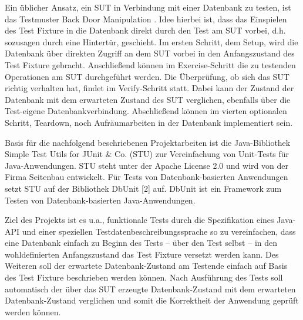 Ein üblicher Ansatz, ein SUT in Verbindung mit einer Datenbank zu testen, ist das Testmuster Back Door Manipulation \cite{XUNIT_TEST_PATTERNS}. Idee hierbei ist, dass das Einspielen des Test Fixture in die Datenbank direkt durch den Test am SUT vorbei, d.h. sozusagen durch eine Hintertür, geschieht. Im ersten Schritt, dem Setup, wird die Datenbank über direkten Zugriff an dem SUT vorbei in den Anfangszustand des Test Fixture gebracht. Anschließend können im Exercise-Schritt die zu testenden Operationen am SUT durchgeführt werden. Die Überprüfung, ob sich das SUT richtig verhalten hat, findet im Verify-Schritt statt. Dabei kann der Zustand der Datenbank mit dem erwarteten Zustand des SUT verglichen, ebenfalls über die Test-eigene Datenbankverbindung. Abschließend können im vierten optionalen Schritt, Teardown, noch Aufräumarbeiten in der Datenbank implementiert sein.

Basis für die nachfolgend beschriebenen Projektarbeiten ist die Java-Bibliothek Simple Test Utils for JUnit \& Co. (STU) zur Vereinfachung von Unit-Tests für Java-Anwendungen. STU steht unter der Apache License 2.0 und wird von der Firma Seitenbau entwickelt. Für Tests von Datenbank-basierten Anwendungen setzt STU auf der Bibliothek DbUnit [2] auf. DbUnit ist ein Framework zum Testen von Datenbank-basierten Java-Anwendungen. 

Ziel des Projekts ist es u.a., funktionale Tests durch die Spezifikation eines Java-API und einer speziellen Testdatenbeschreibungssprache so zu vereinfachen, dass eine Datenbank einfach zu Beginn des Tests – über den Test selbst – in den wohldefinierten Anfangszustand das Test Fixture versetzt werden kann. Des Weiteren soll der erwartete Datenbank-Zustand am Testende einfach auf Basis des Test Fixture beschrieben werden können. Nach Ausführung des Tests soll automatisch der über das SUT erzeugte Datenbank-Zustand mit dem erwarteten Datenbank-Zustand verglichen und somit die Korrektheit der Anwendung geprüft werden können.


